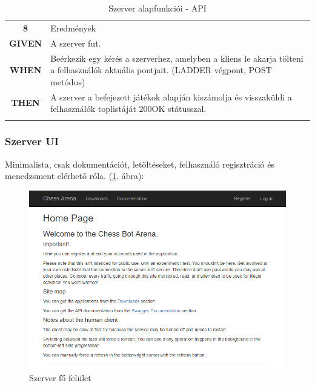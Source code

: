 \documentclass[twoside, a4paper, 12pt]{article}
\begin{document}
\begin{longtable}[c]{|c|p{14cm}|}
	\rowcolor[HTML]{CBCEFB} 
	\textbf{8}
	&	Eredmények
	\\ \nobreakhline
	
	\textbf{GIVEN} &
	A szerver fut.
	\\ \nobreakhline
	
	\textbf{WHEN} &
	Beérkezik egy kérés a szerverhez, amelyben a kliens le akarja tölteni a felhasználók aktuális pontjait. (LADDER végpont, POST metódus)
	\\
	\nobreakhline
	
	\textbf{THEN} &
	A szerver a befejezett játékok alapján kiszámolja és visszaküldi a felhasználók toplistáját 200OK státusszal.
	\\
	\hline
	
	\caption{Szerver alapfunkciói - API}
	\label{userStories:server:api}\\
\end{longtable} 

\subsubsection{Szerver UI}
Minimalista, csak dokumentációt, letöltéseket, felhasználó regisztráció és menedzsment elérhető róla. (\ref{fig:serverUiMainScreen}. ábra):

\begin{figure}[htbp]
	\centering
	\includegraphics[width=1.0\textwidth]{img/serverUiMainScreen.png}
	\caption{Szerver fő felület}
	\label{fig:serverUiMainScreen}
\end{figure}
\end{document}
